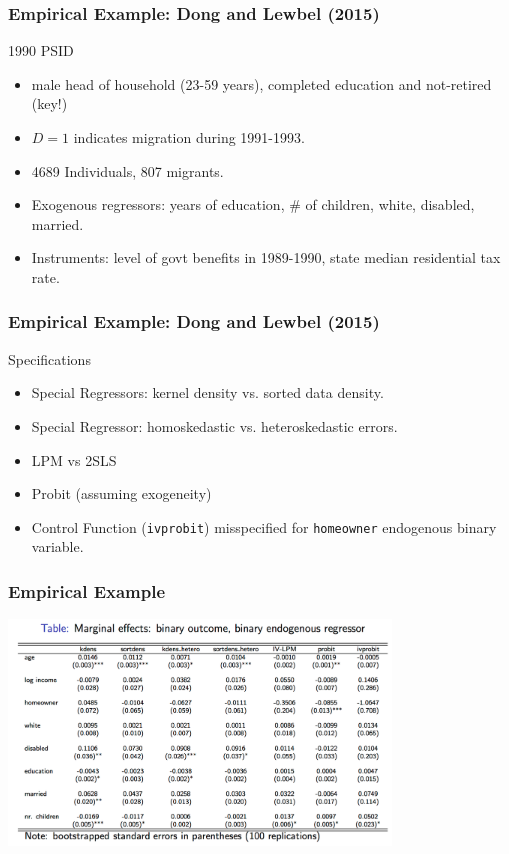 \documentclass[11pt,dvipsnames,table,aspectratio=169]{beamer}
\begin{document}
\begin{frame}
\frametitle{Empirical Example: Dong and Lewbel (2015)}
1990 PSID
\begin{itemize}
\item male head of household (23-59 years), completed education and not-retired (key!)
\item $D=1$ indicates migration during 1991-1993.
\item 4689 Individuals, 807 migrants.
\item Exogenous regressors: years of education, \# of children, white, disabled, married.
\item Instruments: level of govt benefits in 1989-1990, state median residential tax rate.
\end{itemize}
\end{frame}

\begin{frame}
\frametitle{Empirical Example: Dong and Lewbel (2015)}
Specifications
\begin{itemize}
\item Special Regressors: kernel density vs. sorted data density.
\item Special Regressor: homoskedastic vs. heteroskedastic errors.
\item LPM vs 2SLS
\item Probit (assuming exogeneity)
\item Control Function (\texttt{ivprobit}) misspecified for \texttt{homeowner} endogenous binary variable.
\end{itemize}
\end{frame}


\begin{frame}
\frametitle{Empirical Example}
\begin{center}
\includegraphics[width=4in]{resources/specialregtable.png}
\end{center}
\end{frame}
\end{document}
